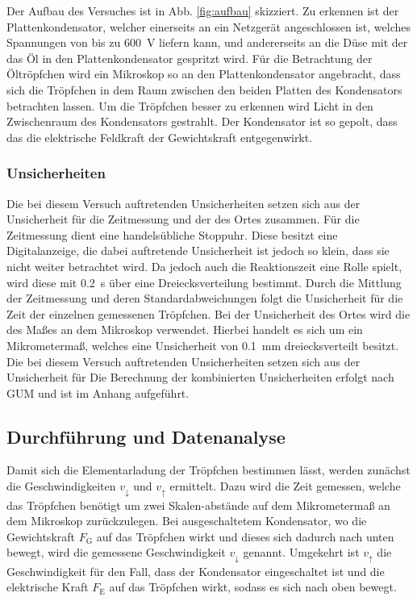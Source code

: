 Der Aufbau des Versuches ist in Abb. \ref{fig:aufbau} skizziert. 
Zu erkennen ist der Plattenkondensator, welcher einerseits an ein Netzgerät angeschlossen ist, welches Spannungen von bis zu \SI{600}{\volt} liefern kann, und andererseits an die Düse mit der das Öl in den Plattenkondensator gespritzt wird.
Für die Betrachtung der Öltröpfchen wird ein Mikroskop so an den Plattenkondensator angebracht, dass sich die Tröpfchen in dem Raum zwischen den beiden Platten des Kondensators betrachten lassen. 
Um die Tröpfchen besser zu erkennen wird Licht in den Zwischenraum des Kondensators gestrahlt.
Der Kondensator ist so gepolt, dass das die elektrische Feldkraft der Gewichtskraft entgegenwirkt.

\subsubsection{Unsicherheiten} 

Die bei diesem Versuch auftretenden Unsicherheiten setzen sich aus der Unsicherheit für die Zeitmessung und der des Ortes zusammen.
Für die Zeitmessung dient eine handelsübliche Stoppuhr.
Diese besitzt eine Digitalanzeige, die dabei auftretende Unsicherheit ist jedoch so klein, dass sie nicht weiter betrachtet wird.
Da jedoch auch die Reaktionszeit eine Rolle spielt, wird diese mit \SI{0,2}{\second} über eine Dreiecksverteilung bestimmt.
Durch die Mittlung der Zeitmessung und deren Standardabweichungen folgt die Unsicherheit für die Zeit der einzelnen gemessenen Tröpfchen.
Bei der Unsicherheit des Ortes wird die des Maßes an dem Mikroskop verwendet.
Hierbei handelt es sich um ein Mikrometermaß, welches eine Unsicherheit von \SI{0,1}{\milli\meter} dreiecksverteilt besitzt.
Die bei diesem Versuch auftretenden Unsicherheiten setzen sich aus der Unsicherheit für %
Die Berechnung der kombinierten Unsicherheiten erfolgt nach GUM und ist im Anhang aufgeführt.

\subsection{Durchführung und Datenanalyse}

Damit sich die Elementarladung der Tröpfchen bestimmen lässt, werden zunächst die Geschwindigkeiten $v_{\downarrow}$ und $v_{\uparrow}$ ermittelt.
Dazu wird die Zeit gemessen, welche das Tröpfchen benötigt um zwei Skalen-abstände auf dem Mikrometermaß an dem Mikroskop zurückzulegen.
Bei ausgeschaltetem Kondensator, wo die Gewichtskraft $F_\text{G}$ auf das Tröpfchen wirkt und dieses sich dadurch nach unten bewegt, wird die gemessene Geschwindigkeit $v_{\downarrow}$ genannt.
Umgekehrt ist $v_{\uparrow}$ die Geschwindigkeit für den Fall, dass der Kondensator eingeschaltet ist und die elektrische Kraft $F_\text{E}$ auf das Tröpfchen wirkt, sodass es sich nach oben bewegt. 

